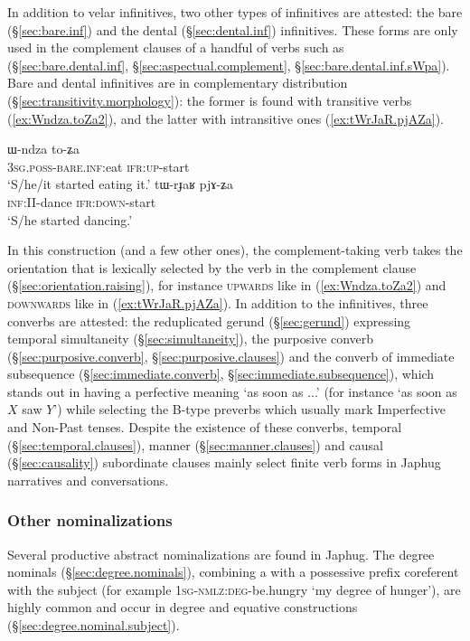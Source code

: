 In addition to velar infinitives, two other types of infinitives are attested: the bare (§\ref{sec:bare.inf}) and the  dental (§\ref{sec:dental.inf}) infinitives. These forms are only used in the complement clauses of a handful of verbs such as  (§\ref{sec:bare.dental.inf}, §\ref{sec:aspectual.complement}, §\ref{sec:bare.dental.inf.sWpa}). Bare and dental infinitives are in complementary distribution (§\ref{sec:transitivity.morphology}): the former is found with transitive verbs (\ref{ex:Wndza.toZa2}), and the latter with intransitive ones (\ref{ex:tWrJaR.pjAZa}).

\begin{exe}
\ex 
\begin{xlist}
\ex \label{ex:Wndza.toZa2}
\gll  ɯ-ndza to-ʑa \\
\textsc{3sg}.\textsc{poss}-\textsc{bare}.\textsc{inf}:eat \textsc{ifr}:\textsc{up}-start \\
\glt `S/he/it started eating it.' 
\ex \label{ex:tWrJaR.pjAZa}
\gll tɯ-rɟaʁ pjɤ-ʑa \\
\textsc{inf}:II-dance \textsc{ifr}:\textsc{down}-start \\
\glt `S/he started dancing.' 
\end{xlist}
\end{exe}

In this construction (and a few other ones), the com\-ple\-ment-taking verb takes the orientation that is lexically selected by the verb in the complement clause (§\ref{sec:orientation.raising}), for instance \textsc{upwards} like  in (\ref{ex:Wndza.toZa2}) and \textsc{downwards} like  in (\ref{ex:tWrJaR.pjAZa}).
In addition to the infinitives, three converbs are attested: the reduplicated gerund  (§\ref{sec:gerund}) expressing temporal simultaneity (§\ref{sec:simultaneity}), the purposive converb (§\ref{sec:purposive.converb}, §\ref{sec:purposive.clauses}) and the converb of immediate subsequence (§\ref{sec:immediate.converb}, §\ref{sec:immediate.subsequence}), which stands out in having a perfective meaning `as soon as ...' (for instance   `as soon as $X$ saw $Y$') while selecting the B-type preverbs which usually mark Imperfective and Non-Past tenses. Despite the existence of these converbs, temporal (§\ref{sec:temporal.clauses}), manner (§\ref{sec:manner.clauses}) and causal (§\ref{sec:causality}) subordinate clauses mainly select finite verb forms in Japhug narratives and conversations.

\subsubsection{Other nominalizations}
Several productive abstract nominalizations are found in Japhug. The degree nominals (§\ref{sec:degree.nominals}), combining a  with a possessive prefix coreferent with the subject (for example  \textsc{1sg}-\textsc{nmlz}:\textsc{deg}-be.hungry `my degree of hunger'), are highly common and occur in degree and equative constructions (§\ref{sec:degree.nominal.subject}).


